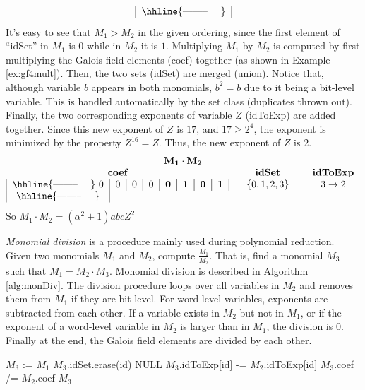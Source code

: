 \begin{Example}
\begin{equation}
\begin{tabular}{|c|c|c|c|c|c|c|c|cccc}
\hhline{--------~~~~}
\end{tabular}
\end{equation}
It's easy to see that $M_1 > M_2$ in the given ordering, since the 
first element of ``idSet'' in $M_1$ is $0$ while in $M_2$ it is $1$.
Multiplying $M_1$ by $M_2$ is computed by first multiplying the Galois field 
elements (coef) together (as shown in Example \ref{ex:gf4mult}). Then, the two
sets (idSet) are merged (union). 
Notice that, although variable $b$ appears in both monomials, $b^2=b$ due to it
being a bit-level variable. This is handled automatically by the set class 
(duplicates thrown out).
Finally, the two corresponding exponents of variable $Z$ (idToExp) are added together. 
Since this new exponent of $Z$ is $17$, and $17\geq 2^4$, the exponent is 
minimized by the property $Z^{16}=Z$. Thus, the new exponent of $Z$ is $2$.
\begin{equation}
\begin{tabular}{|c|c|c|c|c|c|c|c|cccc} 
\multicolumn{12}{c}{$\mathbf{M_1}\cdot\mathbf{M_2}$} \\
\multicolumn{8}{c}{\bf coef} & & {\bf idSet} & & {\bf idToExp}\\
\hhline{--------~~~~}
$0$ & $0$ & $0$ & $0$ & $\mathbf{0}$ & $\mathbf{1}$ & $\mathbf{0}$ & $\mathbf{1}$ & & $\{0, 1, 2, 3\}$ & & $3 \rightarrow 2$ \\
\hhline{--------~~~~}
\end{tabular}
\end{equation}
So $M_1\cdot M_2 = (\alpha^2+1) a b c Z^2$
\end{Example}

{\it Monomial division} is a procedure mainly used during polynomial reduction. 
Given two monomials 
$M_1$ and $M_2$, compute $\frac{M_1}{M_2}$. That is, find a monomial $M_3$ 
such that $M_1 = M_2 \cdot M_3$.
Monomial division is described in Algorithm \ref{alg:monDiv}. The 
division procedure loops over all variables in $M_2$ and removes them from $M_1$ 
if they are bit-level.
For word-level variables, exponents are subtracted from each other.
If a variable exists in $M_2$ but not in $M_1$, or if the exponent of a 
word-level variable in $M_2$ is larger than in $M_1$, the division is $0$.
Finally at the end, the Galois field elements are divided by each other.

\begin{algorithm}[hbt]
\SetAlgoNoLine

        $M_3$ := $M_1$\;
        {
            {
                $M_3$.idSet.erase(id)\;
            }
            {
                {
                    \Return NULL\;
                }
                $M_3$.idToExp[id] -= $M_2$.idToExp[id]\;
            }
        }
        $M_3$.coef /= $M_2$.coef\;
        \Return $M_3$\;
\caption{Monomial Division}\label{alg:monDiv}
\end{algorithm}

